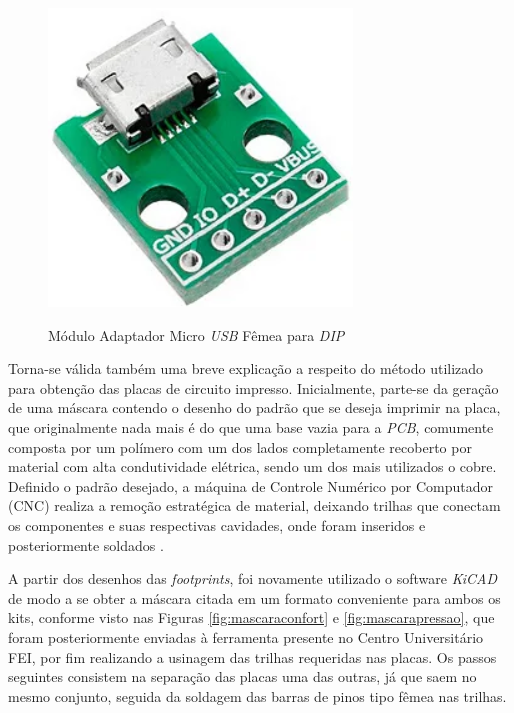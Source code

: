 \documentclass[acronym,symbols,table]{fei}
\begin{document}
\begin{figure}[!htb]
\centering
    \caption{Módulo Adaptador Micro \textit{USB} Fêmea para \textit{DIP}}
    \includegraphics[width=0.25\linewidth]{Imagens/Micro_USB.png}
    \label{fig:micro_usb}
\end{figure}

Torna-se válida também uma breve explicação a respeito do método utilizado para obtenção das placas de circuito impresso. Inicialmente, parte-se da geração de uma máscara contendo o desenho do padrão que se deseja imprimir na placa, que originalmente nada mais é do que uma base vazia para a \textit{PCB}, comumente composta por um polímero com um dos lados completamente recoberto por material com alta condutividade elétrica, sendo um dos mais utilizados o cobre. Definido o padrão desejado, a máquina de Controle Numérico por Computador (CNC) realiza a remoção estratégica de material, deixando trilhas que conectam os componentes e suas respectivas cavidades, onde foram inseridos e posteriormente soldados \cite{sousaPCB}.  

A partir dos desenhos das \textit {footprints}, foi novamente utilizado o software \textit{KiCAD} de modo a se obter a máscara citada em um formato conveniente para ambos os kits, conforme visto nas Figuras \ref{fig:mascaraconfort} e \ref{fig:mascarapressao}, que foram posteriormente enviadas à ferramenta presente no Centro Universitário FEI, por fim realizando a usinagem das trilhas requeridas nas placas. Os passos seguintes consistem na separação das placas uma das outras, já que saem no mesmo conjunto, seguida da soldagem das barras de pinos tipo fêmea nas trilhas.
\end{document}
